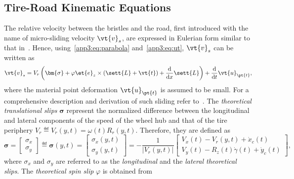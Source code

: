 
\subsection{Tire-Road Kinematic Equations}
\label{app3:sec:kinematic_equations}

The relative velocity between the bristles and the road, first introduced with the name of micro-sliding velocity $\vt{v}_s$, are expressed in Eulerian form similar to that in~\cite{romano2019novel, romano2020unsteadystate, romano2022brush, romano2022analytical, pacejka2012tire, guiggiani2014science, limebeer2018dynamics}. Hence, using~\eqref{app3:eq:parabola} and~\eqref{app3:eq:ut}, $\vt{v}_s$ can be written as
%
\begin{equation}
  \vt{v}_s = V_r\left(\bm{\sigma} + \varphi\et{e}_z \times \left(\sett{L} + \vt{t}\right) + \dfrac{\mathrm{d}}{\mathrm{d}x}\sett{L}\right) + \dfrac{\mathrm{d}}{\mathrm{d}t}\vt{u}_{\pt{t}}
  \label{app3:eq:v_s},
\end{equation}
%
where the material point deformation $\vt{u}_{\pt{t}}$ is assumed to be small. For a comprehensive description and derivation of such sliding refer to~\cite{rill2020road, pacejka2012tire, guiggiani2014science, limebeer2018dynamics, romano2019novel, romano2022brush, romano2022analytical}. The \emph{theoretical translational slips} $\bm{\sigma}$ represent the normalized difference between the longitudinal and lateral components of the speed of the wheel hub and that of the tire periphery $V_r \eqdef V_r(y,t) = \omega(t)R_r(y,t)$. Therefore, they are defined as
%
\begin{equation}
  \bm{\sigma} =
  \begin{bmatrix}
    \sigma_x \\[0.2em]
    \sigma_y
  \end{bmatrix}
  \eqdef \bm{\sigma}(y,t) =
  \begin{bmatrix}
    \sigma_x(y,t) \\[0.2em]
    \sigma_y(y,t)
  \end{bmatrix}
  = -\dfrac{1}{|V_r(y,t)|}
  \begin{bmatrix}
    V_x(t) - V_r(y,t) + \dot{x}_c(t) \\[0.2em]
    V_y(t) - R_z(t)\dot{\gamma}(t) + \dot{y}_c(t)
  \end{bmatrix},
\end{equation}
%
where $\sigma_x$ and $\sigma_y$ are referred to as the \emph{longitudinal} and the \emph{lateral theoretical slips}. The \emph{theoretical spin slip} $\varphi$ is obtained from
